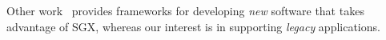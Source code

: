 Other work~\cite{beekman2016improving} provides
frameworks for developing \emph{new} software that takes advantage of SGX,
whereas our interest is in supporting \emph{legacy} applications.









%

